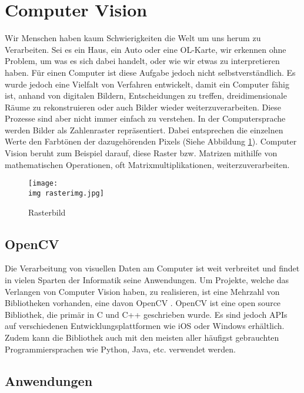 \section{Computer Vision}

Wir Menschen haben kaum Schwierigkeiten die Welt um uns herum zu Verarbeiten. Sei es ein Haus, ein Auto oder eine OL-Karte, wir erkennen ohne Problem, um was es sich dabei handelt, oder wie wir etwas zu interpretieren haben. Für einen Computer ist diese Aufgabe jedoch nicht selbstverständlich. Es wurde jedoch eine Vielfalt von Verfahren entwickelt, damit ein Computer fähig ist, anhand von digitalen Bildern, Entscheidungen zu treffen, dreidimensionale Räume zu rekonstruieren oder auch Bilder wieder  weiterzuverarbeiten. Diese Prozesse sind aber nicht immer einfach zu verstehen. In der Computersprache werden Bilder als Zahlenraster repräsentiert. Dabei entsprechen die einzelnen Werte den Farbtönen der dazugehörenden Pixels (Siehe Abbildung \ref{fig:rasterimg}). \cite{computervision_szeliski:1, opencv_bradski_kaehler:1} Computer Vision beruht zum Beispiel darauf, diese Raster bzw. Matrizen mithilfe von mathematischen Operationen, oft Matrixmultiplikationen, weiterzuverarbeiten.

\begin{figure}[hbt]
	\centering
	\texttt{[image: \\img rasterimg.jpg]}
	\caption{Rasterbild}
	\label{fig:rasterimg}
\end{figure}


\subsection{OpenCV}

Die Verarbeitung von visuellen Daten am Computer ist weit verbreitet und findet in vielen Sparten der Informatik seine Anwendungen. Um Projekte, welche das Verlangen von Computer Vision haben, zu realisieren, ist eine Mehrzahl von Bibliotheken vorhanden, eine davon OpenCV \cite{opencv:1}. OpenCV ist eine open source Bibliothek, die primär in C und C++ geschrieben wurde. Es sind jedoch APIs auf verschiedenen Entwicklungsplattformen wie iOS oder Windows erhältlich. Zudem kann die Bibliothek auch mit den meisten aller häufigst gebrauchten Programmiersprachen wie Python, Java, etc. verwendet werden. \cite{opencv_bradski_kaehler:1}



\subsection{Anwendungen}


